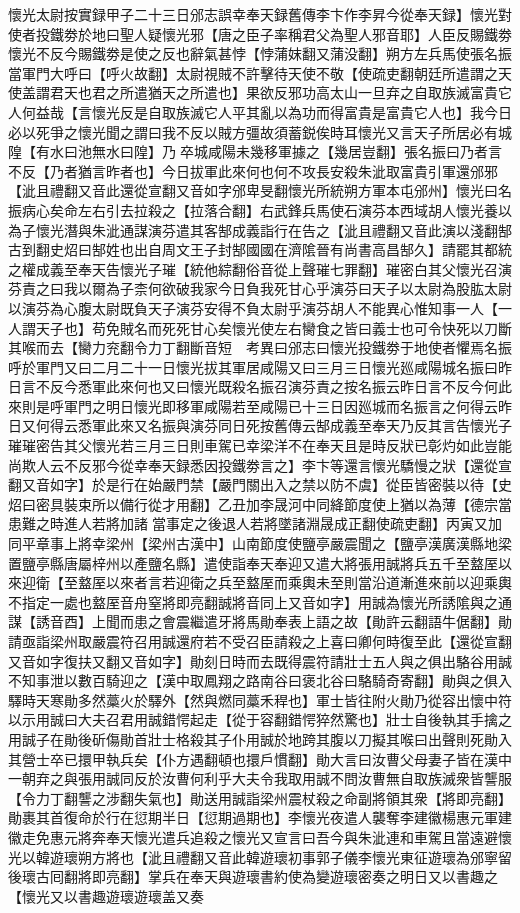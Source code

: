 懷光太尉按實録甲子二十三日邠志誤幸奉天録舊傳李卞作李昇今從奉天録】懷光對使者投鐵劵於地曰聖人疑懷光邪【唐之臣子率稱君父為聖人邪音耶】人臣反賜鐵劵懷光不反今賜鐵劵是使之反也辭氣甚悖【悖蒲妺翻又蒲没翻】朔方左兵馬使張名振當軍門大呼曰【呼火故翻】太尉視賊不許擊待天使不敬【使疏吏翻朝廷所遣謂之天使盖謂君天也君之所遣猶天之所遣也】果欲反邪功高太山一旦弃之自取族滅富貴它人何益哉【言懷光反是自取族滅它人平其亂以為功而得富貴是富貴它人也】我今日必以死爭之懷光聞之謂曰我不反以賊方彊故須蓄鋭俟時耳懷光又言天子所居必有城隍【有水曰池無水曰隍】乃卒城咸陽未幾移軍據之【幾居豈翻】張名振曰乃者言不反【乃者猶言昨者也】今日拔軍此來何也何不攻長安殺朱泚取富貴引軍還邠邪【泚且禮翻又音此還從宣翻又音如字邠卑旻翻懷光所統朔方軍本屯邠州】懷光曰名振病心矣命左右引去拉殺之【拉落合翻】右武鋒兵馬使石演芬本西域胡人懷光養以為子懷光潛與朱泚通謀演芬遣其客郜成義詣行在告之【泚且禮翻又音此演以淺翻郜古到翻史炤曰郜姓也出自周文王子封郜國國在濟隂晉有尚書高昌郜久】請罷其都統之權成義至奉天告懷光子璀【統他綜翻俗音從上聲璀七罪翻】璀密白其父懷光召演芬責之曰我以爾為子柰何欲破我家今日負我死甘心乎演芬曰天子以太尉為股肱太尉以演芬為心腹太尉既負天子演芬安得不負太尉乎演芬胡人不能異心惟知事一人【一人謂天子也】苟免賊名而死死甘心矣懷光使左右臠食之皆曰義士也可令快死以刀斷其喉而去【臠力兖翻令力丁翻斷音短　考異曰邠志曰懷光投鐵劵于地使者懼焉名振呼於軍門又曰二月二十一日懷光拔其軍居咸陽又曰三月三日懷光廵咸陽城名振曰昨日言不反今悉軍此來何也又曰懷光既殺名振召演芬責之按名振云昨日言不反今何此來則是呼軍門之明日懷光即移軍咸陽若至咸陽已十三日因廵城而名振言之何得云昨日又何得云悉軍此來又名振與演芬同日死按舊傳云郜成義至奉天乃反其言告懷光子璀璀密告其父懷光若三月三日則車駕已幸梁洋不在奉天且是時反狀已彰灼如此豈能尚欺人云不反邪今從幸奉天録悉因投鐵劵言之】李卞等還言懷光驕慢之狀【還從宣翻又音如字】於是行在始嚴門禁【嚴門關出入之禁以防不虞】從臣皆密裝以待【史炤曰密具裝束所以備行從才用翻】乙丑加李晟河中同絳節度使上猶以為薄【德宗當患難之時進人若將加諸當事定之後退人若將墜諸淵晟成正翻使疏吏翻】丙寅又加同平章事上將幸梁州【梁州古漢中】山南節度使鹽亭嚴震聞之【鹽亭漢廣漢縣地梁置鹽亭縣唐屬梓州以產鹽名縣】遣使詣奉天奉迎又遣大將張用誠將兵五千至盩厔以來迎衛【至盩厔以來者言若迎衛之兵至盩厔而乘輿未至則當沿道漸進來前以迎乘輿不指定一處也盩厔音舟窒將即亮翻誠將音同上又音如字】用誠為懷光所誘隂與之通謀【誘音酉】上聞而患之會震繼遣牙將馬勛奉表上語之故【勛許云翻語牛倨翻】勛請亟詣梁州取嚴震符召用誠還府若不受召臣請殺之上喜曰卿何時復至此【還從宣翻又音如字復扶又翻又音如字】勛刻日時而去既得震符請壯士五人與之俱出駱谷用誠不知事泄以數百騎迎之【漢中取鳳翔之路南谷曰褒北谷曰駱騎奇寄翻】勛與之俱入驛時天寒勛多然藁火於驛外【然與燃同藁禾稈也】軍士皆往附火勛乃從容出懷中符以示用誠曰大夫召君用誠錯愕起走【從于容翻錯愕猝然驚也】壯士自後執其手擒之用誠子在勛後斫傷勛首壯士格殺其子仆用誠於地跨其腹以刀擬其喉曰出聲則死勛入其營士卒已擐甲執兵矣【仆方遇翻頓也擐戶慣翻】勛大言曰汝曹父母妻子皆在漢中一朝弃之與張用誠同反於汝曹何利乎大夫令我取用誠不問汝曹無自取族滅衆皆讋服【令力丁翻讋之涉翻失氣也】勛送用誠詣梁州震杖殺之命副將領其衆【將即亮翻】勛裹其首復命於行在愆期半日【愆期過期也】李懷光夜遣人襲奪李建徽楊惠元軍建徽走免惠元將奔奉天懷光遣兵追殺之懷光又宣言曰吾今與朱泚連和車駕且當遠避懷光以韓遊瓌朔方將也【泚且禮翻又音此韓遊瓌初事郭子儀李懷光東征遊瓌為邠寧留後瓌古囘翻將即亮翻】掌兵在奉天與遊瓌書約使為變遊瓌密奏之明日又以書趣之【懷光又以書趣遊瓌遊瓌盖又奏